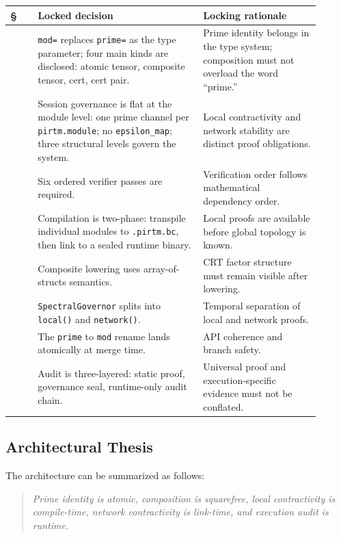 \documentclass[11pt]{article}
\begin{document}
\begin{longtable}{>{\raggedright\arraybackslash}p{0.08\linewidth}
                  >{\raggedright\arraybackslash}p{0.48\linewidth}
                  >{\raggedright\arraybackslash}p{0.34\linewidth}}
\toprule
\textbf{\S} & \textbf{Locked decision} & \textbf{Locking rationale} \\
\midrule
1 & \texttt{mod=} replaces \texttt{prime=} as the type parameter; four main kinds are disclosed: atomic tensor, composite tensor, cert, cert pair. & Prime identity belongs in the type system; composition must not overload the word ``prime.'' \\
2 & Session governance is flat at the module level: one prime channel per \texttt{pirtm.module}; no \texttt{epsilon\_map}; three structural levels govern the system. & Local contractivity and network stability are distinct proof obligations. \\
3 & Six ordered verifier passes are required. & Verification order follows mathematical dependency order. \\
4 & Compilation is two-phase: transpile individual modules to \texttt{.pirtm.bc}, then link to a sealed runtime binary. & Local proofs are available before global topology is known. \\
5 & Composite lowering uses array-of-structs semantics. & CRT factor structure must remain visible after lowering. \\
6 & \texttt{SpectralGovernor} splits into \texttt{local()} and \texttt{network()}. & Temporal separation of local and network proofs. \\
7 & The \texttt{prime} to \texttt{mod} rename lands atomically at merge time. & API coherence and branch safety. \\
8 & Audit is three-layered: static proof, governance seal, runtime-only audit chain. & Universal proof and execution-specific evidence must not be conflated. \\
\bottomrule
\end{longtable}

\subsection{Architectural Thesis}

The architecture can be summarized as follows:

\begin{quote}
\emph{Prime identity is atomic, composition is squarefree, local contractivity is compile-time, network contractivity is link-time, and execution audit is runtime.}
\end{quote}
\end{document}
